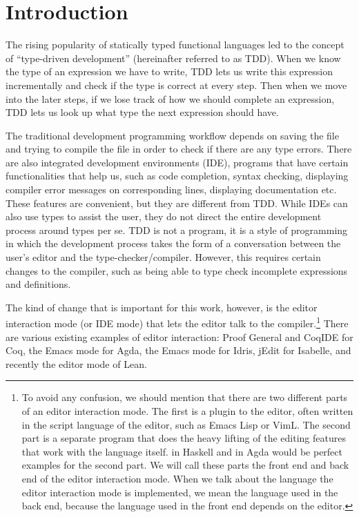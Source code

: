 \section{Introduction} \label{sec:introduction}

The rising popularity of statically typed functional languages led to
the concept of ``type-driven development'' (hereinafter referred to as TDD).
When we know the type of an expression we have to write, TDD lets us write this
expression incrementally and check if the type is correct at every step.  Then
when we move into the later steps, if we lose track of how we should complete
an expression, TDD lets us look up what type the next expression should have.

The traditional development programming workflow depends on saving the
file and trying to compile the file in order to check if there are any type
errors. There are also integrated development environments (IDE), programs that have
certain functionalities that help us, such as code completion, syntax checking,
displaying compiler error messages on corresponding lines, displaying
documentation etc.  These features are convenient, but they are different from
TDD. While IDEs can also use types to assist the user, they do not direct the
entire development process around types per se. TDD is not a program, it is a
style of programming in which the development process takes the form of a
conversation between the user's editor and the type-checker/compiler. However,
this requires certain changes to the compiler, such as being able to type check
incomplete expressions and definitions.\cite{tdd}


The kind of change that is important for this work, however, is the editor
interaction mode (or IDE mode) that lets the editor
talk to the compiler.\footnote{To avoid any confusion, we should mention that
  there are two different parts of an editor interaction mode. The first is a
  plugin to the editor, often written in the script language of the editor,
  such as Emacs Lisp or VimL. The second part is a separate program that does
  the heavy lifting of the editing features that work with the language
  itself.   in Haskell and  in Agda would be
  perfect examples for the second part. We will call these parts the front
  end and back end of the editor interaction mode. When we talk about the
  language the editor interaction mode is implemented, we mean the language
  used in the back end, because the language used in the front end
  depends on the editor.}
There are various existing examples of editor interaction:
Proof General\cite{pg} and CoqIDE for Coq\cite{coq},
the Emacs mode\cite{agdamode} for Agda\cite{agda},
the Emacs mode\cite{idrismode} for Idris\cite{idris},
jEdit\cite{isabellejedit} for Isabelle\cite{isabelle},
and recently the editor mode of Lean\cite{lean}.

